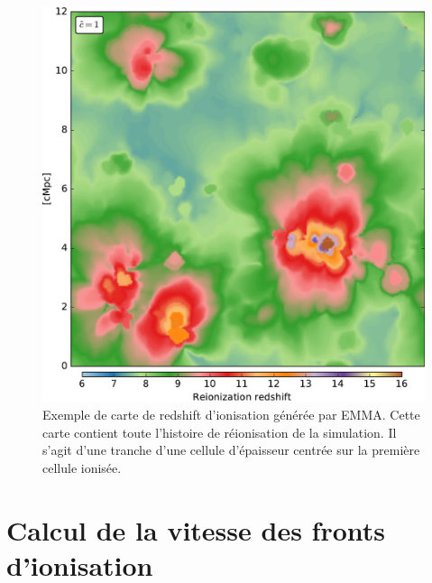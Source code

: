 \begin{figure}
        \includegraphics[width=.95\linewidth]{img/04_mapreio/map_z_c1.pdf} 
        \caption[Carte de redshift d'ionisation]{Exemple de carte de redshift d'ionisation générée par EMMA.
        Cette carte contient toute l'histoire de réionisation de la simulation.
        Il s'agit d'une tranche d'une cellule d'épaisseur centrée sur la première cellule ionisée.
 		\label{fig:zmap}}
\end{figure}


\section{Calcul de la vitesse des fronts d’ionisation}
\label{sec:vreio}

